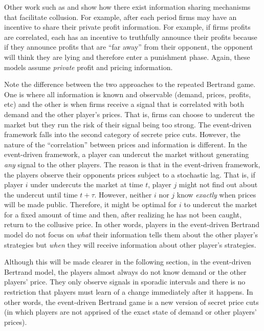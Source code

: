 \documentclass{article}
\begin{document}
Other work such as \cite{powercomm} and \cite{commandcoll} show how
there exist information sharing mechanisms that facilitate collusion.
For example, after each period firms may have an incentive to share
their private profit information.  For example, if firms profits are
correlated, each has an incentive to truthfully announce their profits
because if they announce profits that are ``far away'' from their
opponent, the opponent will think they are lying and therefore enter a
punishment phase.  Again, these models assume \emph{private} profit
and pricing information.

Note the difference between the two approaches to the repeated
Bertrand game.  One is where all information is known and observable
(demand, prices, profits, etc) and the other is when firms receive a
signal that is correlated with both demand and the other player's
prices.  That is, firms can choose to undercut the market but they run
the risk of their signal being too strong.  The event-driven framework
falls into the second category of secrete price cuts.  However, the
nature of the ``correlation'' between prices and information is
different.  In the event-driven framework, a player can undercut the
market without generating \emph{any} signal to the other players.  The
reason is that in the event-driven framework, the players observe
their opponents prices subject to a stochastic lag.  That is, if
player $i$ under undercuts the market at time $t$, player $j$ might
not find out about the undercut until time $t+\tau$.  However, neither
$i$ nor $j$ know \emph{exactly} when prices will be made public.
Therefore, it might be optimal for $i$ to undercut the market for a
fixed amount of time and then, after realizing he has not been caught,
return to the collusive price.  In other words, players in the
event-driven Bertrand model do not focus on \textit{what} their
information tells them about the other player's strategies but
\emph{when} they will receive information about other player's
strategies.

Although this will be made clearer in the following section, in the
event-driven Bertrand model, the players almost always do not know
demand or the other players' price.  They only observe signals in
sporadic intervals and there is no restriction that players must learn
of a change immediately after it happens.  In other words, the
event-driven Bertrand game is a new version of secret price cuts
(in which players are not apprised of the exact state of demand or
other players' prices).
\end{document}
